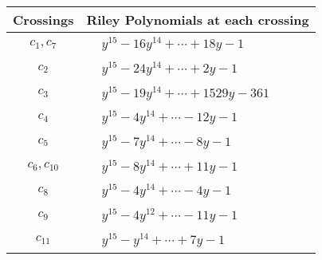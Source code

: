 \documentclass[1p]{elsarticle_modified}
\theoremstyle{definition}
\begin{document}
\begin{tabular}{m{50pt}|m{274pt}}
Crossings & \hspace{64pt}Riley Polynomials at each crossing \\
\hline $$\begin{aligned}c_{1},c_{7}\end{aligned}$$&$\begin{aligned}
&y^{15}-16 y^{14}+\cdots+18 y-1
\end{aligned}$\\
\hline $$\begin{aligned}c_{2}\end{aligned}$$&$\begin{aligned}
&y^{15}-24 y^{14}+\cdots+2 y-1
\end{aligned}$\\
\hline $$\begin{aligned}c_{3}\end{aligned}$$&$\begin{aligned}
&y^{15}-19 y^{14}+\cdots+1529 y-361
\end{aligned}$\\
\hline $$\begin{aligned}c_{4}\end{aligned}$$&$\begin{aligned}
&y^{15}-4 y^{14}+\cdots-12 y-1
\end{aligned}$\\
\hline $$\begin{aligned}c_{5}\end{aligned}$$&$\begin{aligned}
&y^{15}-7 y^{14}+\cdots-8 y-1
\end{aligned}$\\
\hline $$\begin{aligned}c_{6},c_{10}\end{aligned}$$&$\begin{aligned}
&y^{15}-8 y^{14}+\cdots+11 y-1
\end{aligned}$\\
\hline $$\begin{aligned}c_{8}\end{aligned}$$&$\begin{aligned}
&y^{15}-4 y^{14}+\cdots-4 y-1
\end{aligned}$\\
\hline $$\begin{aligned}c_{9}\end{aligned}$$&$\begin{aligned}
&y^{15}-4 y^{12}+\cdots-11 y-1
\end{aligned}$\\
\hline $$\begin{aligned}c_{11}\end{aligned}$$&$\begin{aligned}
&y^{15}- y^{14}+\cdots+7 y-1
\end{aligned}$\\
\hline
\end{tabular}\\~\\
\end{document}
